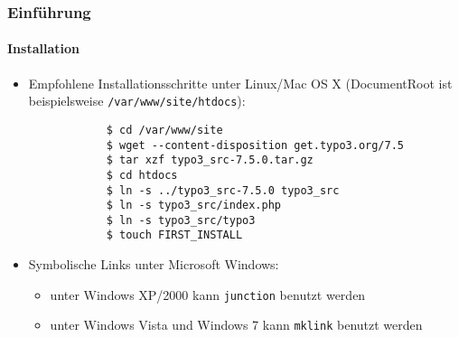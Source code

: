 \begin{frame}[fragile]
	\frametitle{Einführung}
	\framesubtitle{Installation}

	\begin{itemize}
		\item Empfohlene Installationsschritte unter Linux/Mac OS X\newline
			(DocumentRoot ist beispielsweise \texttt{/var/www/site/htdocs}):
		\begin{lstlisting}
			$ cd /var/www/site
			$ wget --content-disposition get.typo3.org/7.5
			$ tar xzf typo3_src-7.5.0.tar.gz
			$ cd htdocs
			$ ln -s ../typo3_src-7.5.0 typo3_src
			$ ln -s typo3_src/index.php
			$ ln -s typo3_src/typo3
			$ touch FIRST_INSTALL
		\end{lstlisting}

		\item Symbolische Links unter Microsoft Windows:

			\begin{itemize}
				\item unter Windows XP/2000 kann \texttt{junction} benutzt werden
				\item unter Windows Vista und Windows 7 kann \texttt{mklink} benutzt werden
			\end{itemize}

	\end{itemize}
\end{frame}

